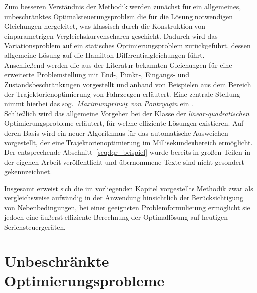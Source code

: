 Zum besseren Verständnis der Methodik werden zunächst für ein allgemeines, unbeschränktes Optimalsteuerungsproblem die für die Lösung notwendigen Gleichungen hergeleitet, was klassisch durch die Konstruktion von einparametrigen Vergleichskurvenscharen geschieht. Dadurch wird das Variationsproblem auf ein statisches Optimierungsproblem zurückgeführt, dessen allgemeine Lösung auf die Hamilton-Differentialgleichungen führt. \\
Anschließend werden die aus der Literatur bekannten Gleichungen für eine erweiterte Problemstellung mit End-, Punkt-, Eingangs- und Zustandsbeschränkungen vorgestellt und anhand von Beispielen aus dem Bereich der Trajektorienoptimierung von Fahrzeugen erläutert. Eine zentrale Stellung nimmt hierbei das sog.\ \emph{Maximumprinzip von Pontryagin} ein \cite{foellingeroptimal, papageorgiou2012optimierung}. \\
Schließlich wird das allgemeine Vorgehen bei der Klasse der \emph{linear-quadratischen} Optimierungsprobleme erläutert, für welche effiziente Lösungen existieren. Auf deren Basis wird ein neuer Algorithmus für das automatische Ausweichen vorgestellt, der eine Trajektorienoptimierung im Millisekundenbereich ermöglicht. Der entsprechende Abschnitt~\ref{seq:lqr_beispiel} wurde bereits in großen Teilen in der eigenen Arbeit  veröffentlicht und übernommene Texte sind nicht gesondert gekennzeichnet.


Insgesamt erweist sich die im vorliegenden Kapitel vorgestellte Methodik zwar als vergleichsweise aufwändig in der Anwendung hinsichtlich der Berücksichtigung von Nebenbedingungen, bei einer geeigneten Problemformulierung ermöglicht sie jedoch eine äußerst effiziente Berechnung der Optimallösung auf heutigen Seriensteuergeräten. 


\section{Unbeschränkte Optimierungsprobleme}

